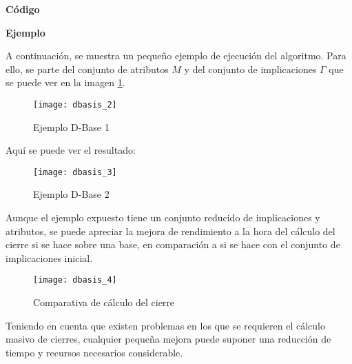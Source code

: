 \newpage 
\textbf{C\'odigo} 

\newpage
\textbf{Ejemplo}

A continuaci\'on, se muestra un peque\~no ejemplo de ejecuci\'on del algoritmo. Para ello, se parte del conjunto de atributos \(M\) y del conjunto de implicaciones \(\Gamma\) que se puede ver en la imagen \ref{fig:dbasis_2}.
\begin{figure}[H]
    \centering
    \texttt{[image: dbasis\_2]}
    \caption{Ejemplo D-Base 1}
    \label{fig:dbasis_2}
\end{figure} 
Aqu\'i se puede ver el resultado:
\begin{figure}[H]
    \centering
    \texttt{[image: dbasis\_3]}
    \caption{Ejemplo D-Base 2}
    \label{fig:dbasis_3}
\end{figure} 
Aunque el ejemplo expuesto tiene un conjunto reducido de implicaciones y atributos, se puede apreciar la mejora de rendimiento a la hora del c\'alculo del cierre si se hace sobre una base, en comparaci\'on a si se hace con el conjunto de implicaciones inicial.
\begin{figure}[H]
    \centering
    \texttt{[image: dbasis\_4]}
    \caption{Comparativa de c\'alculo del cierre}
    \label{fig:dbasis_4}
\end{figure} 

Teniendo en cuenta que existen problemas en los que se requieren el c\'alculo masivo de cierres, cualquier peque\~na mejora puede suponer una reducci\'on de tiempo y recursos necesarios considerable.